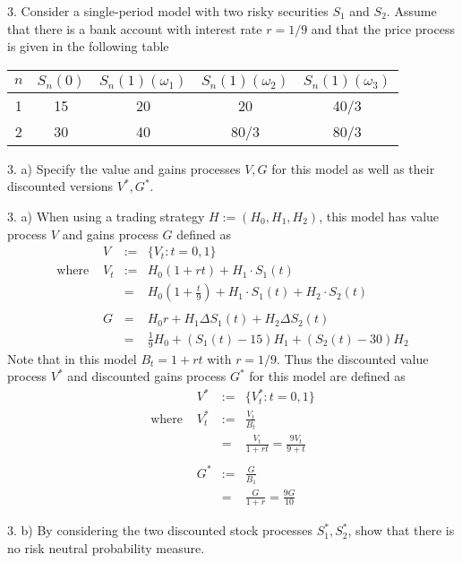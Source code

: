 \documentclass[11pt,a4paper]{article}
\begin{document}
\begin{question}{3.}
  Consider a single-period model with two risky securities $S_1$ and $S_2$. Assume that there is a bank account with interest rate $r=1/9$ and that the price process is given in the following table
  \begin{center}
    \begin{tabular}{c|c|ccc}
      $n$&$S_n(0)$&$S_n(1)(\omega_1)$&$S_n(1)(\omega_2)$&$S_n(1)(\omega_3)$\\\hline
      1&15&20&20&40/3\\
      2&30&40&80/3&80/3
    \end{tabular}
  \end{center}
\end{question}

\begin{question}{3. a)}
  Specify the value and gains processes $V,G$ for this model as well as their discounted versions $V^*,G^*$.
\end{question}

\begin{answer}{3. a)}
  When using a trading strategy $H:=(H_0,H_1,H_2)$, this model has value process $V$ and gains process $G$ defined as
  \[\begin{array}{rrrl}
    &V&:=&\{V_t:t=0,1\}\\
    \text{where }&V_t&:=&H_0(1+rt)+H_1\cdot S_1(t)\\
    &&=&H_0\left(1+\frac{t}9\right)+H_1\cdot S_1(t)+H_2\cdot S_2(t)\\
    \\
    &G&=&H_0r+H_1\Delta S_1(t)+H_2\Delta S_2(t)\\
    &&=&\frac19H_0+(S_1(t)-15)H_1+(S_2(t)-30)H_2
  \end{array}\]
  Note that in this model $B_t=1+rt$ with $r=1/9$. Thus the discounted value process $V^*$ and discounted gains process $G^*$ for this model are defined as
  \[\begin{array}{rrcl}
    &V^*&:=&\{V_t^*:t=0,1\}\\
    \text{where }&V_t^*&:=&\frac{V_t}{B_t}\\
    &&=&\frac{V_t}{1+rt}=\frac{9V_t}{9+t}\\
    \\
    &G^*&:=&\frac{G}{B_1}\\
    &&=&\frac{G}{1+r}=\frac{9G}{10}
  \end{array}\]
\end{answer}

\begin{question}{3. b)}
  By considering the two discounted stock processes $S_1^*,S_2^*$, show that there is no risk neutral probability measure.
\end{question}
\end{document}
